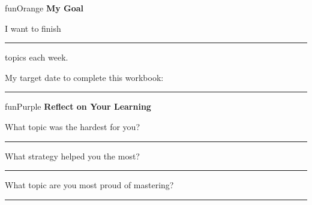 {\begin{center}
\begin{minipage}{0.84\textwidth}
\end{minipage}
\end{center}

\vspace{5mm}

\begin{center}
\begin{minipage}{0.84\textwidth}
\begin{wbDashBox}{funOrange}
    {\bfseries\color{black!80}\faBullseye\hspace{2mm}My Goal}

    \vspace{3mm}

    I want to finish \rule[-2pt]{1.5cm}{0.5pt} topics each week.

    \vspace{3mm}

    My target date to complete this workbook: \rule[-2pt]{4cm}{0.5pt}
\end{wbDashBox}
\end{minipage}
\end{center}

\vspace{5mm}

\begin{center}
\begin{minipage}{0.84\textwidth}
\begin{wbDashBox}{funPurple}
    {\bfseries\color{black!80}\faPen\hspace{2mm}Reflect on Your Learning}

    \vspace{4mm}

    What topic was the hardest for you?

    \vspace{1mm}
    \noindent\textcolor{black!15}{\rule{\linewidth}{0.3pt}}

    \vspace{4mm}

    What strategy helped you the most?

    \vspace{1mm}
    \noindent\textcolor{black!15}{\rule{\linewidth}{0.3pt}}

    \vspace{4mm}

    What topic are you most proud of mastering?

    \vspace{1mm}
    \noindent\textcolor{black!15}{\rule{\linewidth}{0.3pt}}
\end{wbDashBox}
\end{minipage}
\end{center}

}

\clearpage
